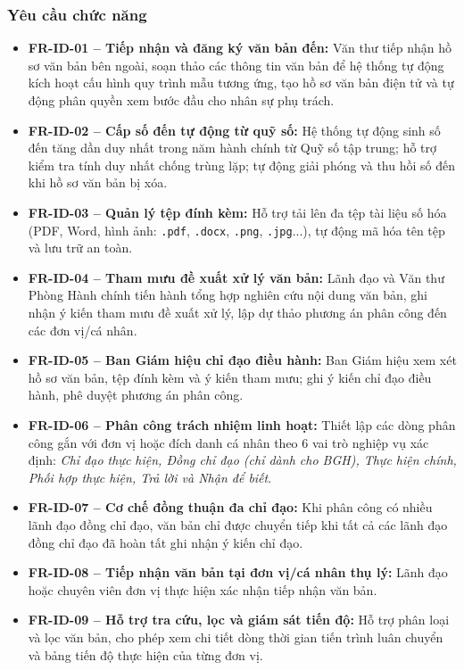 \subsubsection{Yêu cầu chức năng}
\begin{itemize}
    \item \textbf{FR-ID-01 -- Tiếp nhận và đăng ký văn bản đến:} Văn thư tiếp nhận hồ sơ văn bản bên ngoài, soạn thảo các thông tin văn bản để hệ thống tự động kích hoạt cấu hình quy trình mẫu tương ứng, tạo hồ sơ văn bản điện tử và tự động phân quyền xem bước đầu cho nhân sự phụ trách.
    \item \textbf{FR-ID-02 -- Cấp số đến tự động từ quỹ số:} Hệ thống tự động sinh số đến tăng dần duy nhất trong năm hành chính từ Quỹ số tập trung; hỗ trợ kiểm tra tính duy nhất chống trùng lặp; tự động giải phóng và thu hồi số đến khi hồ sơ văn bản bị xóa.
    \item \textbf{FR-ID-03 -- Quản lý tệp đính kèm:} Hỗ trợ tải lên đa tệp tài liệu số hóa (PDF, Word, hình ảnh: \texttt{.pdf}, \texttt{.docx}, \texttt{.png}, \texttt{.jpg}...), tự động mã hóa tên tệp và lưu trữ an toàn.
    \item \textbf{FR-ID-04 -- Tham mưu đề xuất xử lý văn bản:} Lãnh đạo và Văn thư Phòng Hành chính tiến hành tổng hợp nghiên cứu nội dung văn bản, ghi nhận ý kiến tham mưu đề xuất xử lý, lập dự thảo phương án phân công đến các đơn vị/cá nhân.
    \item \textbf{FR-ID-05 -- Ban Giám hiệu chỉ đạo điều hành:} Ban Giám hiệu xem xét hồ sơ văn bản, tệp đính kèm và ý kiến tham mưu; ghi ý kiến chỉ đạo điều hành, phê duyệt phương án phân công.
    \item \textbf{FR-ID-06 -- Phân công trách nhiệm linh hoạt:} Thiết lập các dòng phân công gắn với đơn vị hoặc đích danh cá nhân theo 6 vai trò nghiệp vụ xác định: \textit{Chỉ đạo thực hiện, Đồng chỉ đạo (chỉ dành cho BGH), Thực hiện chính, Phối hợp thực hiện, Trả lời và Nhận để biết}.
    \item \textbf{FR-ID-07 -- Cơ chế đồng thuận đa chỉ đạo:} Khi phân công có nhiều lãnh đạo đồng chỉ đạo, văn bản chỉ được chuyển tiếp khi tất cả các lãnh đạo đồng chỉ đạo đã hoàn tất ghi nhận ý kiến chỉ đạo.
    \item \textbf{FR-ID-08 -- Tiếp nhận văn bản tại đơn vị/cá nhân thụ lý:} Lãnh đạo hoặc chuyên viên đơn vị thực hiện xác nhận tiếp nhận văn bản.
    \item \textbf{FR-ID-09 -- Hỗ trợ tra cứu, lọc và giám sát tiến độ:} Hỗ trợ phân loại và lọc văn bản, cho phép xem chi tiết dòng thời gian tiến trình luân chuyển và bảng tiến độ thực hiện của từng đơn vị.
\end{itemize}

